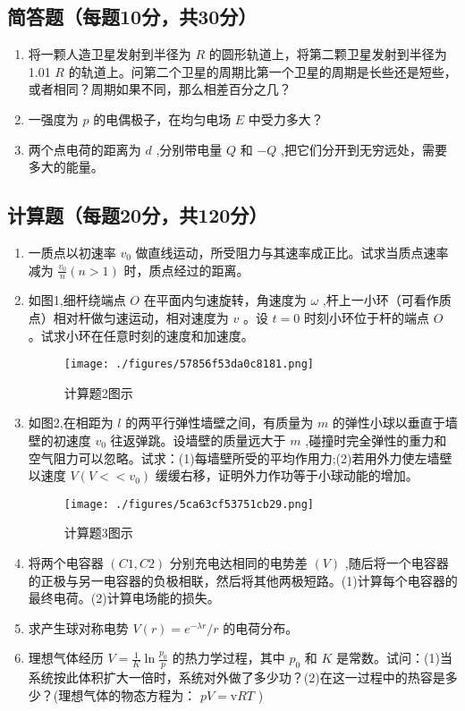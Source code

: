 

\subsection{ 简答题（每题10分，共30分）}
\begin{enumerate}
\item 将一颗人造卫星发射到半径为 $R$ 的圆形轨道上，将第二颗卫星发射到半径为1.01 $R$ 的轨道上。问第二个卫星的周期比第一个卫星的周期是长些还是短些，或者相同？周期如果不同，那么相差百分之几？

\item 一强度为 $p$ 的电偶极子，在均匀电场 $E$ 中受力多大？

\item 两个点电荷的距离为 $d$ ,分别带电量 $Q$ 和 $-Q$ ,把它们分开到无穷远处，需要多大的能量。
\end{enumerate}
\subsection{计算题（每题20分，共120分）}
\begin{enumerate}
\item 一质点以初速率 $v_0$ 做直线运动，所受阻力与其速率成正比。试求当质点速率减为 $\frac{v_0}{n}(n>1)$ 时，质点经过的距离。

\item 如图1,细杆绕端点 $O$ 在平面内匀速旋转，角速度为 $\omega$ ,杆上一小环（可看作质点）相对杆做匀速运动，相对速度为 $v$ 。设 $t=0$ 时刻小环位于杆的端点 $O$ 。试求小环在任意时刻的速度和加速度。\\
\begin{figure}[ht]
\centering
\texttt{[image: ./figures/57856f53da0c8181.png]}
\caption{计算题2图示} \label{fig_USTC13_1}
\end{figure}

\item 如图2,在相距为 $l$ 的两平行弹性墙壁之间，有质量为 $m$ 的弹性小球以垂直于墙壁的初速度 $v_0$ 往返弹跳。设墙壁的质量远大于 $m$ ,碰撞时完全弹性的重力和空气阻力可以忽略。试求：(1)每墙壁所受的平均作用力;(2)若用外力使左墙壁以速度 $V(V<<v_0)$ 缓缓右移，证明外力作功等于小球动能的增加。\\
\begin{figure}[ht]
\centering
\texttt{[image: ./figures/5ca63cf53751cb29.png]}
\caption{计算题3图示} \label{fig_USTC13_2}
\end{figure}

\item 将两个电容器 $(C1,C2)$ 分别充电达相同的电势差 $(V)$ ,随后将一个电容器的正极与另一电容器的负极相联，然后将其他两极短路。(1)计算每个电容器的最终电荷。(2)计算电场能的损失。

\item 求产生球对称电势 $V(r)=e^{-\lambda r}/r$ 的电荷分布。

\item 理想气体经历 $V=\frac{1}{K} \ln \frac{p_{0}}{p}$ 的热力学过程，其中 $p_0$ 和 $K$ 是常数。试问：(1)当系统按此体积扩大一倍时，系统对外做了多少功？(2)在这一过程中的热容是多少？(理想气体的物态方程为： $pV=\mathrm v RT$ )
\end{enumerate}
